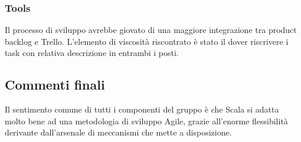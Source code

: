 \subsubsection{Tools}
Il processo di sviluppo avrebbe giovato di una maggiore integrazione tra product backlog e Trello. L'elemento di viscosità riscontrato è stato il dover riscrivere i task con relativa descrizione in entrambi i posti.



\subsection{Commenti finali}
Il sentimento comune di tutti i componenti del gruppo è che Scala si adatta molto bene ad una metodologia di sviluppo Agile, grazie all'enorme flessibilità derivante dall'arsenale di meccanismi che mette a disposizione.

